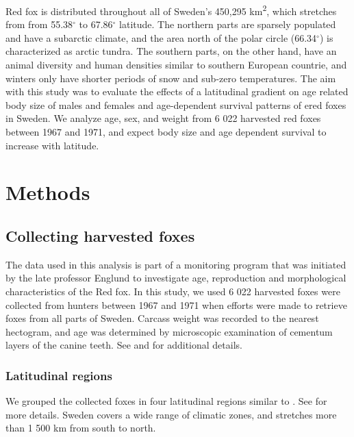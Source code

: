 \documentclass[12pt, a4paper]{article}
\begin{document}
Red fox is distributed throughout all of Sweden's 450,295 km\textsuperscript{2}, which stretches from  from 55.38$^{\circ}$ to 67.86$^{\circ}$ latitude.  The northern parts are sparsely populated and have a subarctic climate, and the area north of the polar circle (66.34$^{\circ}$) is characterized as arctic tundra. The southern parts, on the other hand, have an animal  diversity and human densities similar to southern European countrie, and winters only have shorter periods of snow and sub-zero temperatures. The aim with this study was to evaluate the effects of a latitudinal gradient on age related body size of males and females and age-dependent survival patterns of ered foxes in Sweden. We analyze age, sex, and weight from 6 022 harvested red foxes between 1967 and 1971, and expect body size and age dependent survival to increase with latitude.


\section*{Methods}

\subsection*{Collecting harvested foxes}

The data used in this analysis is part of a monitoring program that was initiated by the late professor Englund to investigate age, reproduction and morphological characteristics of the Red fox. In this study, we used 6 022 harvested foxes were collected from hunters between 1967 and 1971 when efforts were made to retrieve foxes from all parts of Sweden. Carcass weight was recorded to the nearest hectogram, and age was determined by microscopic examination of cementum layers of the canine teeth.  See \citep{englund1965studies} and \cite{englund1970some} for additional details. 

\subsubsection*{Latitudinal regions}



We grouped the collected foxes in four latitudinal regions similar to \cite{englund1970some}.  See \citep{zhengEstimatingNetPrimary2004, GeographySweden2025,MarkanvandningenSverigeLand2013} for more details. Sweden covers a wide range of climatic zones, and stretches more than 1 500 km from south to north.  
\end{document}
